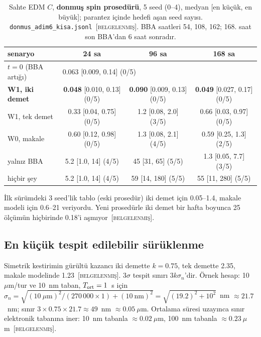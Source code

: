 \documentclass[11pt,a4paper]{article}
\newcommand{\kod}[1]{{\XeTeXinterchartokenstate=0\texttt{#1}}}
\newcommand{\BEL}{\textsc{[belgelenmiş]}}
\begin{document}
\begin{table}[H]\centering\small
\caption{Sahte EDM $C$, \textbf{donmuş spin prosedürü}, 5 seed (0--4), medyan [en küçük, en büyük];
parantez içinde hedefi aşan seed sayısı. \kod{donmus\_adim6\_kisa.jsonl}~\BEL. BBA saatleri 54, 108, 162;
168. saat son BBA'dan 6 saat sonradır.}
\footnotesize
\begin{tabular}{lccc}
\toprule
senaryo & 24 sa & 96 sa & 168 sa \\
\midrule
$t=0$ (BBA artığı) & \multicolumn{3}{l}{0.063 [0.009, 0.14] (0/5)} \\
\textbf{W1, iki demet} & \textbf{0.048} [0.010, 0.13] (0/5) & \textbf{0.090} [0.009, 0.13] (0/5) & \textbf{0.049} [0.027, 0.17] (0/5) \\
W1, tek demet & 0.33 [0.04, 0.75] (0/5) & 1.2 [0.08, 2.0] (3/5) & 0.66 [0.03, 0.97] (0/5) \\
W0, makale & 0.60 [0.12, 0.98] (0/5) & 1.3 [0.08, 2.1] (4/5) & 0.59 [0.25, 1.3] (2/5) \\
yalnız BBA & 5.2 [1.0, 14] (4/5) & 45 [31, 65] (5/5) & 1.3 [0.05, 7.7] (3/5) \\
hiçbir şey & 5.2 [1.0, 14] (4/5) & 59 [14, 180] (5/5) & 55 [11, 280] (5/5) \\
\bottomrule
\end{tabular}
\end{table}
İlk sürümdeki 3 seed'lik tablo (eski prosedür) iki demet için 0.05--1.4, makale modeli için 0.6--21
veriyordu. Yeni prosedürle iki demet bir hafta boyunca 25 ölçümün hiçbirinde 0.18'i aşmıyor~\BEL.

\subsection{En küçük tespit edilebilir sürüklenme}
Simetrik kestirimin gürültü kazancı iki demette $k=0.75$, tek demette 2.35, makale modelinde 1.23~\BEL.
3$\sigma$ tespit sınırı $3k\sigma_n$'dir. Örnek hesap: 10~$\mu$m/tur ve 10~nm taban, $T_{\rm ort}=1$~s
için $\sigma_n=\sqrt{(10~\mu\text{m})^2/(270\,000\times1)+(10~\text{nm})^2}=\sqrt{(19.2)^2+10^2}$~nm
$\approx21.7$~nm; sınır $3\times0.75\times21.7\approx49$~nm $\approx0.05~\mu$m. Ortalama süresi uzayınca
sınır elektronik tabanına iner: 10~nm tabanla $\approx0.02~\mu$m, 100~nm tabanla $\approx0.23~\mu$m~\BEL.
\end{document}
